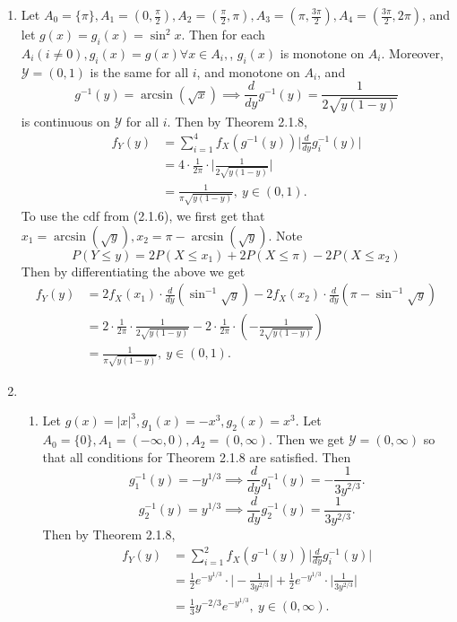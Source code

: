 \documentclass{article}
\begin{document}
\begin{enumerate}
    \item Let $A_0 = \{\pi\}, A_1 = (0, \frac{\pi}{2}), A_2 = (\frac{\pi}{2}, \pi), A_3 = (\pi, \frac{3\pi}{2}), 
    A_4 = (\frac{3\pi}{2}, 2\pi)$, and let $g(x) = g_i(x) = \sin^2{x}$. Then for each $A_i (i \neq 0), g_i(x) = g(x) 
    \forall x \in A_i,$, $g_i(x)$ is monotone on $A_i$. Moreover, $\mathcal{Y} = (0, 1)$ is the same for all $i$, and 
    monotone on $A_i$, and 
    \[
    g^{-1}(y) = \arcsin{(\sqrt{x})} \implies \frac{d}{dy}g^{-1}(y) = \frac{1}{2\sqrt{y(1 - y)}}
    \]
    is continuous on $\mathcal{Y}$ for all $i$. Then by Theorem 2.1.8,
    \begin{align*}
        f_{Y}(y) 
        &= \sum_{i = 1}^{4} f_{X}(g^{-1}(y)) \Big| \frac{d}{dy}g_{i}^{-1}(y) \Big| \\
        &= 4 \cdot \frac{1}{2\pi} \cdot \Big| \frac{1}{2\sqrt{y(1 - y)}} \Big| \\
        &= \frac{1}{\pi\sqrt{y(1 - y)}}, \ y \in (0, 1).
    \end{align*}
    To use the cdf from (2.1.6), we first get that $x_1 = \arcsin{(\sqrt{y})}, x_2 = \pi - \arcsin{(\sqrt{y})}$. Note 
    \[ P(Y \leq y) = 2P(X \leq x_1) + 2P(X \leq \pi) - 2P(X \leq x_2) \]
    Then by differentiating the above we get 
    \begin{align*}
        f_{Y}(y)
        &= 2f_{X}(x_1) \cdot \frac{d}{dy}(\sin^{-1}{\sqrt{y}}) 
        - 2f_{X}(x_2) \cdot \frac{d}{dy}(\pi - \sin^{-1}{\sqrt{y}}) \\
        &= 2 \cdot \frac{1}{2\pi} \cdot \frac{1}{2\sqrt{y(1 - y)}} 
        - 2 \cdot \frac{1}{2\pi} \cdot (-\frac{1}{2\sqrt{y(1 - y)}}) \\
        &= \frac{1}{\pi\sqrt{y(1 - y)}}, \ y \in (0, 1).
    \end{align*}

    \item \begin{enumerate}
        \item Let $g(x) = |x|^3, g_1(x) = -x^3, g_2(x) = x^3$. Let $A_0 = \{0\}, A_1 = (-\infty, 0), 
        A_2 = (0, \infty)$. Then we get $\mathcal{Y} = (0, \infty)$ so that all conditions for Theorem 2.1.8 are 
        satisfied. Then 
        \[ g_{1}^{-1}(y) = -y^{1/3} \implies \frac{d}{dy}g_{1}^{-1}(y) = -\frac{1}{3y^{2/3}}. \]
        \[ g_{2}^{-1}(y) = y^{1/3} \implies \frac{d}{dy}g_{2}^{-1}(y) = \frac{1}{3y^{2/3}}. \]        
        Then by Theorem 2.1.8,
        \begin{align*}
            f_{Y}(y) 
            &= \sum_{i = 1}^{2} f_{X}(g^{-1}(y)) \Big| \frac{d}{dy}g_{i}^{-1}(y) \Big| \\
            &= \frac{1}{2}e^{-y^{1/3}} \cdot \Big| -\frac{1}{3y^{2/3}} \Big|
            + \frac{1}{2}e^{-y^{1/3}} \cdot \Big| \frac{1}{3y^{2/3}} \Big| \\
            &= \frac{1}{3}y^{-2/3}e^{-y^{1/3}}, \ y \in (0, \infty).
        \end{align*}


\end{enumerate}
\end{enumerate}
\end{document}
